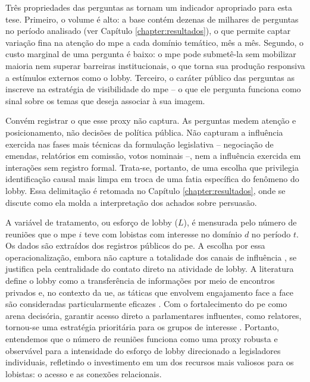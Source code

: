 Três propriedades das perguntas as tornam um indicador apropriado para esta tese. Primeiro, o volume é alto: a base contém dezenas de milhares de perguntas no período analisado (ver Capítulo \ref{chapter:resultados}), o que permite captar variação fina na atenção do \acrshort{mpe} a cada domínio temático, mês a mês. Segundo, o custo marginal de uma pergunta é baixo: o \acrshort{mpe} pode submetê-la sem mobilizar maioria nem superar barreiras institucionais, o que torna sua produção responsiva a estímulos externos como o lobby. Terceiro, o caráter público das perguntas as inscreve na estratégia de visibilidade do \acrshort{mpe} -- o que ele pergunta funciona como sinal sobre os temas que deseja associar à sua imagem.

Convém registrar o que esse proxy não captura. As perguntas medem atenção e posicionamento, não decisões de política pública. Não capturam a influência exercida nas fases mais técnicas da formulação legislativa -- negociação de emendas, relatórios em comissão, votos nominais --, nem a influência exercida em interações sem registro formal. Trata-se, portanto, de uma escolha que privilegia identificação causal mais limpa em troca de uma fatia específica do fenômeno do lobby. Essa delimitação é retomada no Capítulo \ref{chapter:resultados}, onde se discute como ela molda a interpretação dos achados sobre persuasão.

A variável de tratamento, ou esforço de lobby ($L$), é mensurada pelo número de reuniões que o \acrshort{mpe} $i$ teve com lobistas com interesse no domínio $d$ no período $t$. Os dados são extraídos dos registros públicos do \acrshort{pe}. A escolha por essa operacionalização, embora não capture a totalidade dos canais de influência \cite{dur_measuring_2008}, se justifica pela centralidade do contato direto na atividade de lobby. A literatura define o lobby como a transferência de informações por meio de encontros privados \cite{de_figueiredo_advancing_2014} e, no contexto da \acrshort{ue}, as táticas que envolvem engajamento face a face são consideradas particularmente eficazes \cite{Huwyler2022}. Com o fortalecimento do \acrshort{pe} como arena decisória, garantir acesso direto a parlamentares influentes, como relatores, tornou-se uma estratégia prioritária para os grupos de interesse \cite{kluver2015legislative, marshall2010lobby}. Portanto, entendemos que o número de reuniões funciona como uma proxy robusta e observável para a intensidade do esforço de lobby direcionado a legisladores individuais, refletindo o investimento em um dos recursos mais valiosos para os lobistas: o acesso e as conexões relacionais.

